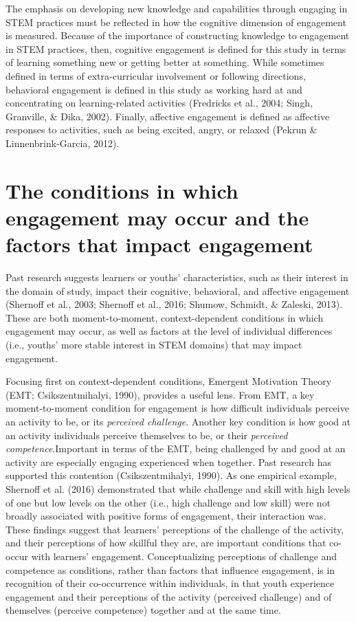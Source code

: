 \documentclass[]{book}
\theoremstyle{definition}
\theoremstyle{definition}
\theoremstyle{definition}
\theoremstyle{remark}
\begin{document}
The emphasis on developing new knowledge and capabilities through
engaging in STEM practices must be reflected in how the cognitive
dimension of engagement is measured. Because of the importance of
constructing knowledge to engagement in STEM practices, then, cognitive
engagement is defined for this study in terms of learning something new
or getting better at something. While sometimes defined in terms of
extra-curricular involvement or following directions, behavioral
engagement is defined in this study as working hard at and concentrating
on learning-related activities (Fredricks et al., 2004; Singh,
Granville, \& Dika, 2002). Finally, affective engagement is defined as
affective responses to activities, such as being excited, angry, or
relaxed (Pekrun \& Linnenbrink-Garcia, 2012).

\section{The conditions in which engagement may occur and the factors
that impact
engagement}\label{the-conditions-in-which-engagement-may-occur-and-the-factors-that-impact-engagement}

Past research suggests learners or youths' characteristics, such as
their interest in the domain of study, impact their cognitive,
behavioral, and affective engagement (Shernoff et al., 2003; Shernoff et
al., 2016; Shumow, Schmidt, \& Zaleski, 2013). These are both
moment-to-moment, context-dependent conditions in which engagement may
occur, as well as factors at the level of individual differences (i.e.,
youths' more stable interest in STEM domains) that may impact
engagement.

Focusing first on context-dependent conditions, Emergent Motivation
Theory (EMT; Csikszentmihalyi, 1990), provides a useful lens. From EMT,
a key moment-to-moment condition for engagement is how difficult
individuals perceive an activity to be, or its \emph{perceived
challenge}. Another key condition is how good at an activity individuals
perceive themselves to be, or their \emph{perceived
competence}.Important in terms of the EMT, being challenged by and good
at an activity are especially engaging experienced when together. Past
research has supported this contention (Csikszentmihalyi, 1990). As one
empirical example, Shernoff et al. (2016) demonstrated that while
challenge and skill with high levels of one but low levels on the other
(i.e., high challenge and low skill) were not broadly associated with
positive forms of engagement, their interaction was. These findings
suggest that learners' perceptions of the challenge of the activity, and
their perceptions of how skillful they are, are important conditions
that co-occur with learners' engagement. Conceptualizing perceptions of
challenge and competence as conditions, rather than factors that
influence engagement, is in recognition of their co-occurrence within
individuals, in that youth experience engagement and their perceptions
of the activity (perceived challenge) and of themselves (perceive
competence) together and at the same time.
\end{document}
